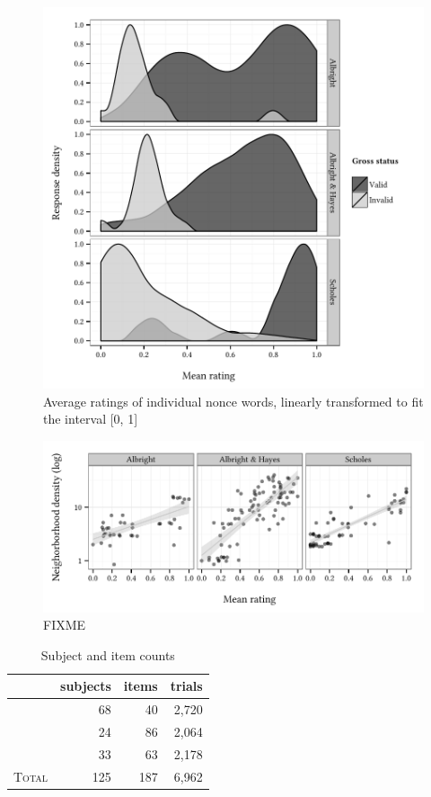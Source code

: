 \begin{figure}
\centering
\includegraphics{density.pdf}
\caption{Average ratings of individual nonce words, linearly transformed to fit the interval [0, 1]}
\label{dsn}
\end{figure}

\begin{figure}
\centering
\includegraphics{neighborhood.pdf}
\caption{FIXME}
\label{neighborhood}
\end{figure}

\begin{table}
\centering
\begin{tabular}{l rrr}
\toprule
                        & subjects & items & trials \\
\midrule
\citealt{Albright2007}  & 68       & 40    & 2,720  \\
\citealt{Albright2003a} & 24       & 86    & 2,064  \\
\citealt{Scholes1966}   & 33       & 63    & 2,178  \\
\midrule
\textsc{Total}          & 125      & 187   & 6,962  \\
\bottomrule
\end{tabular}
\caption{Subject and item counts}
\label{counts}
\end{table}

